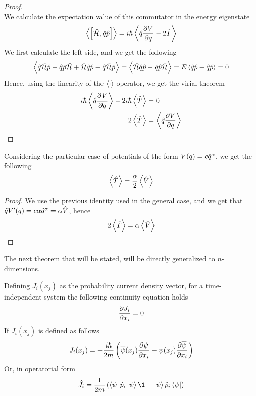 \documentclass[../qm.tex]{subfiles}
\begin{document}
\begin{proof}
\begin{equation*}
		\end{equation*}
		We calculate the expectation value of this commutator in the energy eigenstate
		\begin{equation*}
			\expval{\comm{\opr{\ham}}{\opr{q}\opr{p}}}=i\hbar\expval{\opr{q}\pdv{V}{q}-2\opr{T}}
		\end{equation*}
		We first calculate the left side, and we get the following
		\begin{equation*}
			\expval{\hat{q}\hat{\mathcal{H}}\hat{p}-\hat{q}\hat{p}\hat{\mathcal{H}}+\hat{\mathcal{H}}\hat{q}\hat{p}-\hat{q}\hat{\mathcal{H}}\hat{p}}=\expval{\hat{\mathcal{H}}\hat{q}\hat{p}-\hat{q}\hat{p}\hat{\mathcal{H}}}=E\expval{\hat{q}\hat{p}-\hat{q}\hat{p}}=0
		\end{equation*}
		Hence, using the linearity of the $\expval{\cdot}$ operator, we get the virial theorem
		\begin{equation*}
			\begin{aligned}
				i\hbar\expval{\hat{q}\pdv{V}{q}}-2i\hbar\expval{\hat{T}}&=0\\
				2\expval{\hat{T}}&=\expval{\hat{q}\pdv{V}{q}}
			\end{aligned}
		\end{equation*}
	\end{proof}
	\begin{cor}
		Considering the particular case of potentials of the form $V(q)=c\hat{q}^{\alpha}$, we get the following
		\begin{equation*}
			\expval{\hat{T}}=\frac{\alpha}{2}\expval{\hat{V}}
		\end{equation*}
	\end{cor}
	\begin{proof}
		We use the previous identity used in the general case, and we get that $\hat{q}V'(q)=c\alpha\hat{q}^{\alpha}=\alpha\hat{V}$, hence
		\begin{equation*}
			2\expval{\hat{T}}=\alpha\expval{\hat{V}}
		\end{equation*}
	\end{proof}
	The next theorem that will be stated, will be directly generalized to $n$-dimensions.
	\begin{thm}
		Defining $J_i(x_j)$ as the probability current density vector, for a time-independent system the following continuity equation holds
		\begin{equation*}
			\pdv{J_i}{x_i}=0
		\end{equation*}
		If $J_i(x_j)$ is defined as follows
		\begin{equation*}
			J_i(x_j)=-\frac{i\hbar}{2m}\left(\overline{\psi}(x_j)\pdv{\psi}{x_i}-\psi(x_j)\pdv{\overline{\psi}}{x_i}\right)
		\end{equation*}
		Or, in operatorial form
		\begin{equation*}
			\opr{J}_i=\frac{1}{2m}\left( \bra{\psi}\opr{p}_i\ket{\psi}\1-\ket{\psi}\opr{p}_i\bra{\psi} \right)
		\end{equation*}
	\end{thm}
\end{document}
